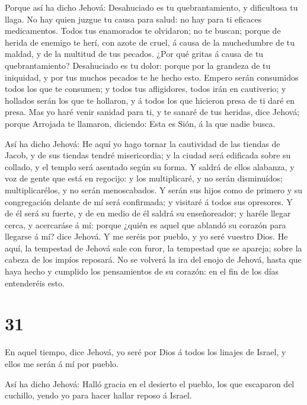  Porque así ha dicho Jehová: Desahuciado es tu
quebrantamiento, y dificultosa tu llaga.  No hay quien
juzgue tu causa para salud: no hay para ti eficaces medicamentos.
 Todos tus enamorados te olvidaron; no te buscan; porque de
herida de enemigo te herí, con azote de cruel, á causa de la muchedumbre
de tu maldad, y de la multitud de tus pecados.  ¿Por qué
gritas á causa de tu quebrantamiento? Desahuciado es tu dolor: porque
por la grandeza de tu iniquidad, y por tus muchos pecados te he hecho
esto.  Empero serán consumidos todos los que te consumen; y
todos tus afligidores, todos irán en cautiverio; y hollados serán los
que te hollaron, y á todos los que hicieron presa de ti daré en presa.
 Mas yo haré venir sanidad para ti, y te sanaré de tus
heridas, dice Jehová; porque Arrojada te llamaron, diciendo: Esta es
Sión, á la que nadie busca.

 Así ha dicho Jehová: He aquí yo hago tornar la cautividad
de las tiendas de Jacob, y de sus tiendas tendré misericordia; y la
ciudad será edificada sobre su collado, y el templo será asentado según
su forma.  Y saldrá de ellos alabanza, y voz de gente que
está en regocijo: y los multiplicaré, y no serán disminuídos;
multiplicarélos, y no serán menoscabados.  Y serán sus
hijos como de primero y su congregación delante de mí será confirmada; y
visitaré á todos sus opresores.  Y de él será su fuerte, y
de en medio de él saldrá su enseñoreador; y haréle llegar cerca, y
acercaráse á mí: porque ¿quién es aquel que ablandó su corazón para
llegarse á mí? dice Jehová.  Y me seréis por pueblo, y yo
seré vuestro Dios.  He aquí, la tempestad de Jehová sale
con furor, la tempestad que se apareja; sobre la cabeza de los impíos
reposará.  No se volverá la ira del enojo de Jehová, hasta
que haya hecho y cumplido los pensamientos de su corazón: en el fin de
los días entenderéis esto.

\hypertarget{section-30}{%
\section{31}\label{section-30}}

 En aquel tiempo, dice Jehová, yo seré por Dios á todos los
linajes de Israel, y ellos me serán á mí por pueblo.

 Así ha dicho Jehová: Halló gracia en el desierto el pueblo,
los que escaparon del cuchillo, yendo yo para hacer hallar reposo á
Israel.

